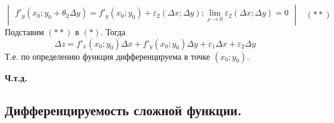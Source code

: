 \documentclass[12pt]{article}
\begin{document}
\begin{adjustwidth}{1.5em}{1.5em}
\[\begin{vmatrix}
            f'_y(x_0; y_0 + \theta_2 \Delta y) = f'_y (x_0; y_0) + \varepsilon_2 (\Delta x; \Delta y); \lim_{\rho \to 0} \varepsilon_2(\Delta x; \Delta y) = 0
        \end{vmatrix} \,\,\,\,\, (**) \]
        Подставим $(**)$ в $(*)$. Тогда
        \[ \Delta z = f'_x(x_0; y_0)\Delta x + f'_y(x_0; y_0)\Delta y + \varepsilon_1\Delta x + \varepsilon_2 \Delta y \]
        Т.е. по определению функция дифференцируема в точке $(x_0; y_0)$.
        \begin{center}
            \textbf{Ч.т.д.}
        \end{center}
    \end{adjustwidth}

    \subsection{Дифференцируемость сложной функции.}
\end{document}

